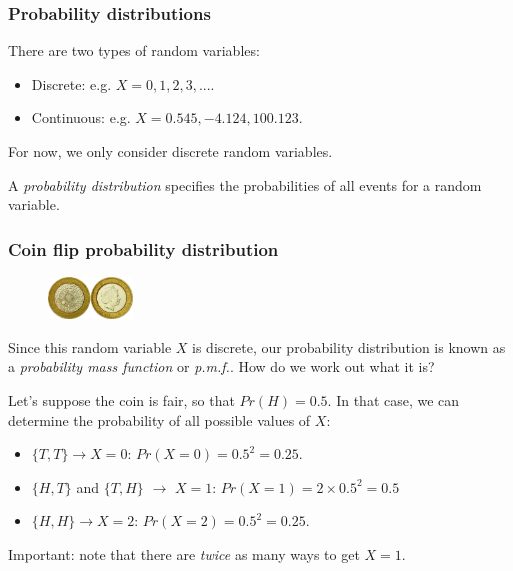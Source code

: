 \documentclass{beamer}
\begin{document}
	\begin{frame}
		\frametitle{Probability distributions}
		
		There are two types of random variables:
		
		\begin{itemize}
			\item Discrete: e.g. $X=0, 1, 2, 3, ...$.
			\item Continuous: e.g. $X=0.545, -4.124, 100.123$.
		\end{itemize}
		
		For now, we only consider discrete random variables.
		
		\vspace{0.5cm}
		
		A \textit{probability distribution} specifies the probabilities of all events for a random variable.
		
	\end{frame}
	
	\begin{frame}
		\frametitle{Coin flip probability distribution}
		
		\begin{figure}[ht]
			\includegraphics[width=0.2\textwidth]{./figures/coins.jpeg}
		\end{figure}
		
		Since this random variable $X$ is discrete, our probability distribution is known as a \textit{probability mass function} or \textit{p.m.f.}. How do we work out what it is?
		
		\vspace{0.5cm}
		
		Let's suppose the coin is fair, so that $Pr(H) = 0.5$. In that case, we can determine the probability of all possible values of $X$:
		
		\begin{itemize}
			\item $\{T,T\}\rightarrow X=0$: $Pr(X=0) = 0.5^2 = 0.25$.
			\item $\{H,T\}$ and $\{T,H\}$ $\rightarrow$ $X=1$: $Pr(X = 1) = 2 \times 0.5^2 = 0.5$
			\item $\{H,H\} \rightarrow X=2$: $Pr(X=2) = 0.5^2 = 0.25$.
		\end{itemize}
		
		Important: note that there are \textit{twice} as many ways to get $X=1$.
		
	\end{frame}
	
\end{document}

